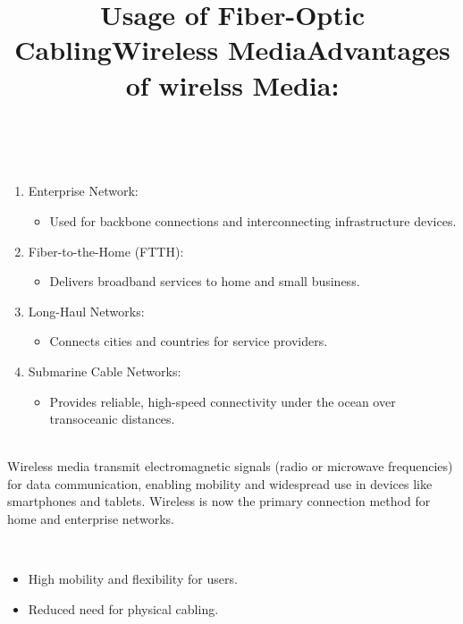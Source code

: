 \documentclass[a4paper,11pt]{article}
\begin{document}
\title{Usage of Fiber-Optic Cabling}\\
\begin{enumerate}
    \item Enterprise Network:\\
    \begin{itemize}
        \item Used for backbone connections and interconnecting infrastructure devices.\\
    \end{itemize}
    \item Fiber-to-the-Home (FTTH):\\
        \begin{itemize}
        \item Delivers broadband services to home and small business.\\
    \end{itemize}
    \item Long-Haul Networks:\\
        \begin{itemize}
        \item Connects cities and countries for service providers.\\
    \end{itemize}
    \item Submarine Cable Networks:\\
        \begin{itemize}
        \item  Provides reliable, high-speed connectivity under the ocean over transoceanic distances.\\
    \end{itemize}
\end{enumerate}

\title{Wireless Media}\\
Wireless media transmit electromagnetic signals (radio or microwave frequencies) for data communication, enabling mobility and widespread use in devices like smartphones and tablets. Wireless is now the primary connection method for home and enterprise networks.\\

\title{Advantages of wirelss Media:}\\
\begin{itemize}
    \item High mobility and flexibility for users.\\
    \item Reduced need for physical cabling.\\
\end{itemize}
\end{document}
